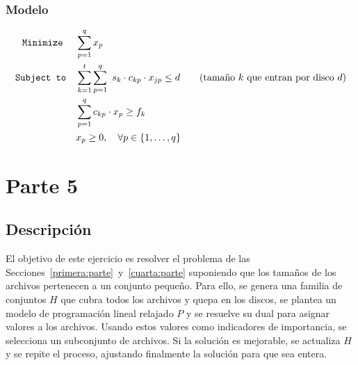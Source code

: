 \documentclass[11pt, a4paper, pdftex]{article}
\begin{document}

\subsubsection{Modelo}

\begin{alignat*}{2}
	\texttt{Minimize}\quad\,\,
	& \sum_{p = 1}^{q} x_{p}\\
	\texttt{Subject to}\quad
	& \sum_{k=1}^{t} \sum_{p = 1}^{q}\ s_{k} \cdot c_{kp} \cdot x_{jp} \le d \qquad \text{(tamaño $k$ que entran por disco $d$)}\\
	& \sum_{p = 1}^{q} c_{kp} \cdot x_{p} \ge f_{k} \\
	& x_{p} \ge 0, \quad \forall p \in \{1, \ldots, q\}
\end{alignat*}

\section{Parte 5}\label{quinta:parte}

\subsection{Descripción}

El objetivo de este ejercicio es resolver el problema de las
Secciones~\ref{primera:parte}~y~\ref{cuarta:parte} suponiendo que los tamaños
de los archivos pertenecen a un conjunto pequeño. Para ello, se genera una
familia de conjuntos $H$ que cubra todos los archivos y quepa en los discos, se
plantea un modelo de programación lineal relajado $P$ y se resuelve su dual
para asignar valores a los archivos. Usando estos valores como indicadores de
importancia, se selecciona un subconjunto de archivos. Si la solución es
mejorable, se actualiza $H$ y se repite el proceso, ajustando finalmente la
solución para que sea entera.
\end{document}
